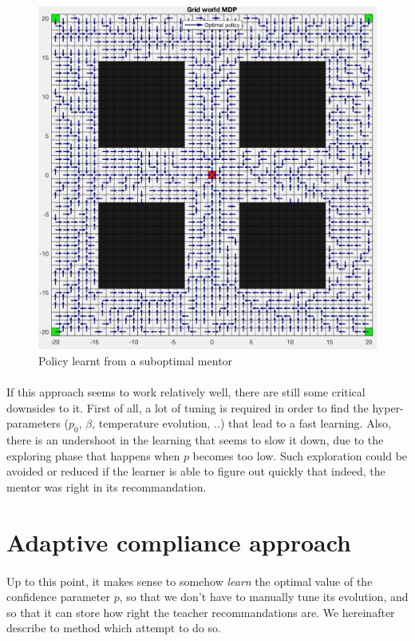 \documentclass[a4paper]{report}
\begin{document}
{{{{			\begin{figure}[h!]
				\begin{center}
					\includegraphics[width=0.7\linewidth]{learnt_from_mentor}
					\caption{Policy learnt from a suboptimal mentor}
					\label{fig::learnt_from_mentor}
				\end{center}
			\end{figure}


		}		
		
		\paragraph{} If this approach seems to work relatively well, there are still some critical downsides to it. First of all, a lot of tuning is required in order to find the hyper-parameters ($p_0$, $\beta$, temperature evolution, ..) that lead to a fast learning. Also, there is an undershoot in the learning that seems to slow it down, due to the exploring phase that happens when $p$ becomes too low.  Such exploration could be avoided or reduced if the learner is able to figure out quickly that indeed, the mentor was right in its recommandation.
	}
	
	\section{Adaptive compliance approach}
	{	
	
		\paragraph{} Up to this point, it makes sense to somehow \emph{learn} the optimal value of the confidence parameter $p$, so that we don't have to manually tune its evolution, and so that it can store how right the teacher recommandations are. We hereinafter describe to method which attempt to do so. 
		
}}}
\end{document}
